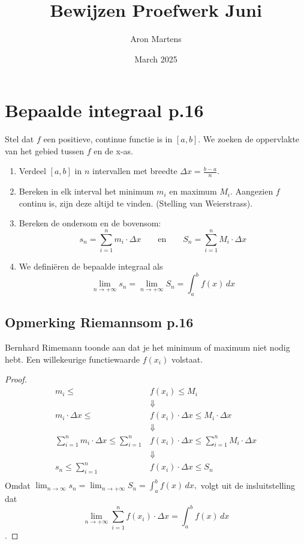 \documentclass{article}
\title{Bewijzen Proefwerk Juni}
\author{Aron Martens}
\date{March 2025}
\theoremstyle{definition}
\begin{document}
\maketitle

\section{Bepaalde integraal p.16}
Stel dat $f$ een positieve, continue functie is in $\left[a,b\right]$. We zoeken de oppervlakte van het gebied tussen $f$ en de x-as.
\begin{enumerate}
  \item Verdeel $\left[a,b\right]$ in $n$ intervallen met breedte $\Delta{x}=\frac{b-a}{n}.$
  \item Bereken in elk interval het minimum $m_i$ en maximum $M_i$. Aangezien $f$ continu is, zijn deze altijd te vinden. (Stelling van Weierstrass).
  \item Bereken de ondersom en de bovensom: $$s_n=\sum_{i=1}^{n}m_i\cdot \Delta{x}\quad\quad \text{en} \quad\quad S_n=\sum_{i=1}^{n}M_i\cdot \Delta{x}$$
  \item We definiëren de bepaalde integraal als $$\lim_{n\to + \infty }s_n = \lim_{n\to + \infty}S_n=\int_a^bf(x)\,dx$$
\end{enumerate}

\subsection{Opmerking Riemannsom p.16}
Bernhard Rimemann toonde aan dat je het minimum of maximum niet nodig hebt. Een willekeurige functiewaarde $f\left(x_i\right)$ volstaat.
\begin{proof}
  \begin{align*}
  m_i \leq &f\left(x_i\right) \leq M_i\\
           &\Downarrow \\
  m_i \cdot \Delta{x} \leq &f\left(x_i\right) \cdot \Delta{x}\leq M_i\cdot \Delta{x}\\
                           &\Downarrow \\
  \sum_{i=1}^{n}m_i\cdot \Delta x \leq \sum_{i=1}^{n} &f\left(x_i\right)\cdot \Delta x \leq \sum_{i=1}^{n} M_i \cdot \Delta{x}\\
                                                      &\Downarrow \\
  s_n \leq \sum_{i=1}^{n} &f\left(x_i\right) \cdot \Delta x \leq S_n\\
  \end{align*}
  Omdat $\displaystyle\lim_{n\to \infty}s_n = \displaystyle\lim_{n\to + \infty}S_n = \displaystyle\int_{a}^{b}f(x)\,dx,$ volgt uit de insluitstelling dat
  $$\lim_{n\to + \infty}\sum_{i=1}^{n}f(x_i)\cdot \Delta x = \displaystyle\int_{a}^{b}f(x)\,dx$$.
\end{proof}
\end{document}
